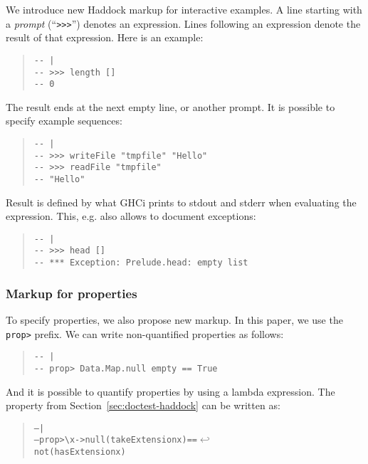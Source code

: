 \documentclass[preprint]{sigplanconf}
\begin{document}
We introduce new Haddock markup for interactive examples.  A line
starting with a \emph{prompt} (``{\tt >>>}'') denotes an expression.
Lines following an expression denote the result of that expression.
Here is an example:

\begin{quote}
\small
\begin{verbatim}
-- |
-- >>> length []
-- 0
\end{verbatim}
\end{quote}

\noindent The result ends at the next empty line, or another prompt.
It is possible to specify example sequences:

\begin{quote}
\small
\begin{verbatim}
-- |
-- >>> writeFile "tmpfile" "Hello"
-- >>> readFile "tmpfile"
-- "Hello"
\end{verbatim}
\end{quote}

\noindent Result is defined by what GHCi prints to stdout and stderr
when evaluating the expression.  This, e.g. also allows to document
exceptions:

\begin{quote}
\small
\begin{verbatim}
-- |
-- >>> head []
-- *** Exception: Prelude.head: empty list
\end{verbatim}
\end{quote}

\subsubsection{Markup for properties}
\label{sec:markup}

\noindent To specify properties, we also propose new markup. In this paper, we
use the {\tt prop>} prefix. We can write non-quantified properties as follows:

\begin{quote}
\small
\begin{verbatim}
-- |
-- prop> Data.Map.null empty == True
\end{verbatim}
\end{quote}

\noindent And it is possible to quantify properties by using a
lambda expression. The property from Section~\ref{sec:doctest-haddock}
can be written as:

\begin{quote}
\small
\begin{alltt}
-- |
-- prop> \verb|\|x -> null (takeExtension x) == \(\hookleftarrow\)
               not (hasExtension x)
\end{alltt}
\end{quote}
\end{document}
